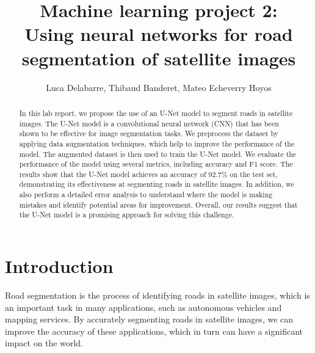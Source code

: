 \documentclass[10pt,conference,compsocconf]{IEEEtran}
\begin{document}
\title{\Large{Machine learning project 2:\\
Using neural networks for road segmentation of satellite images}}

\author{Luca Delabarre, Thibaud Banderet, Mateo Echeverry Hoyos}

\maketitle

\begin{abstract}
In this lab report, we propose the use of an U-Net model to segment roads in satellite images. The U-Net model is a convolutional neural network (CNN) that has been shown to be effective for image segmentation tasks. We preprocess the dataset by applying data augmentation techniques, which help to improve the performance of the model. The augmented dataset is then used to train the U-Net model. We evaluate the performance of the model using several metrics, including accuracy and F1 score. The results show that the U-Net model achieves an accuracy of 92.7\% on the test set, demonstrating its effectiveness at segmenting roads in satellite images. In addition, we also perform a detailed error analysis to understand where the model is making mistakes and identify potential areas for improvement. Overall, our results suggest that the U-Net model is a promising approach for solving this challenge.
\end{abstract}

\section{Introduction}
Road segmentation is the process of identifying roads in satellite images, which is an important task in many applications, such as autonomous vehicles and mapping services. By accurately segmenting roads in satellite images, we can improve the accuracy of these applications, which in turn can have a significant impact on the world.
\end{document}
